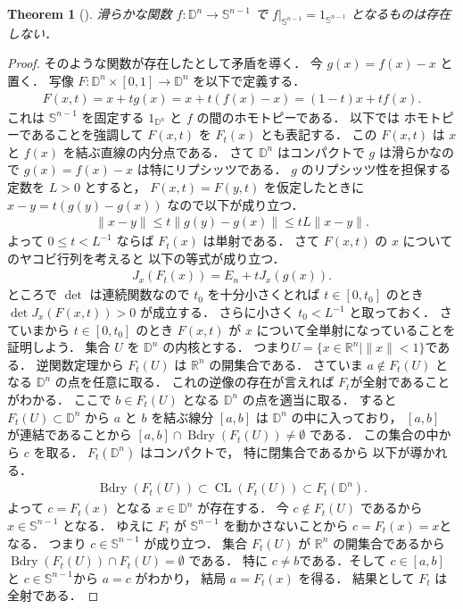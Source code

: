 \documentclass[leqno, a4paper, 12pt]{jsarticle}
\theoremstyle{plain}
\newtheorem{thm}{Theorem}[section]
\theoremstyle{definition}
\theoremstyle{remark}
\newcommand{\rr}{\mathbb{R}}
\DeclareMathOperator{\bd}{\mathrm{Bdry}}
\DeclareMathOperator{\cl}{\mathrm{CL}}
\newcommand{\yospfont}[1]{\mathbb{#1}}
\newcommand{\yodisc}[1]{\yospfont{D}^{#1}}
\newcommand{\yosphere}[1]{\yospfont{S}^{#1}}
\newcommand{\yoidmap}[1]{1_{#1}}
\numberwithin{equation}{section}
\begin{document}
\begin{thm}[\cite{zbMATH03699860}]
滑らかな関数
$f\colon \yodisc{n}\to \yosphere{n-1}$
で
$f|_{\yosphere{n-1}}=\yoidmap{\yosphere{n-1}}$
となるものは存在しない．
\end{thm}
\begin{proof}
そのような関数が存在したとして矛盾を導く．
今
$g(x)=f(x)-x$
と置く．
写像
$F\colon \yodisc{n}\times [0, 1]\to \yodisc{n}$
を以下で定義する．
\begin{align}
F(x,t)=x+tg(x)=x+t(f(x)-x)=(1-t)x+tf(x).
\end{align}
これは
$\yosphere{n-1}$
を固定する
$\yoidmap{\yodisc{n}}$
と
$f$
の間のホモトピーである．
以下では
ホモトピーであることを強調して
$F(x, t)$
を
$F_{t}(x)$
とも表記する．
この
$F(x, t)$
は
$x$
と
$f(x)$
を結ぶ直線の内分点である．
さて
$\yodisc{n}$
はコンパクトで
$g$
は滑らかなので
$g(x)=f(x)-x$
は特にリプシッツである．
$g$
のリプシッツ性を担保する定数を
$L>0$
とすると，
$F(x, t)=F(y, t)$
を仮定したときに
$x-y=t(g(y)-g(x))$
なので以下が成り立つ．
\begin{align}
\|x-y\|\le t\|g(y)-g(x)\|\le tL\|x-y\|. 
\end{align}
よって
$0\le t< L^{-1}$
ならば
$F_t(x)$
は単射である．
さて
$F(x,t)$
の
$x$
についてのヤコビ行列を考えると
以下の等式が成り立つ．
\begin{align}
J_{x}(F_{t}(x))=E_{n}+tJ_{x}(g(x)). 
\end{align}
ところで
$\det$
は連続関数なので
$t_{0}$
を十分小さくとれば
$t\in [0, t_{0}]$
のとき
$\det J_x(F(x,t))>0$
が成立する．
さらに小さく
$t_{0}< L^{-1}$
と取っておく．
さていまから
$t\in [0, t_{0}]$
のとき
$F(x, t)$
が
$x$
について全単射になっていることを証明しよう．
集合
$U$
を
$\yodisc{n}$
の内核とする．
つまり$U=\{x\in \rr^n\mid \|x\|<1\}$である．
逆関数定理から
$F_{t}(U)$
は
$\rr^{n}$
の開集合である．
さていま
$a\not\in F_{t}(U)$
となる
$\yodisc{n}$
の点を任意に取る．
これの逆像の存在が言えれば
$F_{t}$が全射であることがわかる．
ここで
$b\in F_{t}(U)$
となる
$\yodisc{n}$
の点を適当に取る．
すると
$F_{t}(U)\subset \yodisc{n}$
から
$a$
と
$b$
を結ぶ線分
$[a, b]$
は
$\yodisc{n}$
の中に入っており，
$[a,b]$
が連結であることから
$[a, b]\cap\bd(F_{t}(U))\neq \emptyset$
である．
この集合の中から
$c$
を取る．
$F_{t}(\yodisc{n})$
はコンパクトで，
特に閉集合であるから
以下が導かれる．
\begin{align}
\bd(F_{t}(U))\subset \cl(F_{t}(U))\subset  F_{t}(\yodisc{n}). 
\end{align}
よって
$c=F_{t}(x)$
となる
$x\in \yodisc{n}$
が存在する．
今
$c\not\in F_t(U)$
であるから
$x\in \yosphere{n-1}$
となる．
ゆえに
$F_{t}$
が
$\yosphere{n-1}$
を動かさないことから
$c=F_t(x)=x$となる．
つまり
$c\in \yosphere{n-1}$
が成り立つ．
集合
$F_{t}(U)$
が
$\rr^n$
の開集合であるから
$\bd(F_t(U))\cap F_t(U)=\emptyset$
である．
特に
$c\neq b$である．そして
$c\in [a,b]$
と
$c\in \yosphere{n-1}$から
$a=c$
がわかり，
結局
$a=F_t(x)$
を得る．
結果として
$F_{t}$
は全射である．





\end{proof}
\end{document}

